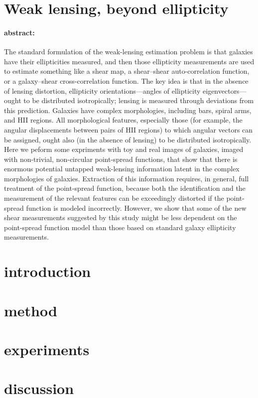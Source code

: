 \documentclass[12pt,letterpaper]{article}
\begin{document}
\sloppy\sloppypar

\section*{Weak lensing, beyond ellipticity}

\paragraph{abstract:}
The standard formulation of the weak-lensing estimation problem is that
  galaxies have their ellipticities measured,
  and then those ellipticity measurements are used to estimate something like
  a shear map, a shear--shear auto-correlation function, or a galaxy--shear cross-correlation function.
The key idea is that in the absence of lensing distortion,
  ellipticity orientations---angles of ellipticity eigenvectors---ought to be distributed isotropically;
  lensing is measured through deviations from this prediction.
Galaxies have complex morphologies,
  including bars, spiral arms, and HII regions.
All morphological features, especially those
  (for example, the angular displacements between pairs of HII regions)
  to which angular vectors can be assigned,
  ought also (in the absence of lensing) to be distributed isotropically.
Here we peform some expriments with toy and real images of galaxies,
  imaged with non-trivial, non-circular point-spread functions,
  that show that there is enormous potential untapped weak-lensing information
  latent in the complex morphologies of galaxies.
Extraction of this information requires, in general,
  full treatment of the point-spread function,
  because both the identification and the measurement of the relevant features
  can be exceedingly distorted if the point-spread function is modeled incorrectly.
However, we show that some of the new shear measurements suggested by this study
  might be less dependent on the point-spread function model
  than those based on standard galaxy ellipticity measurements.

\section{introduction}

\section{method}

\section{experiments}

\section{discussion}
\end{document}
